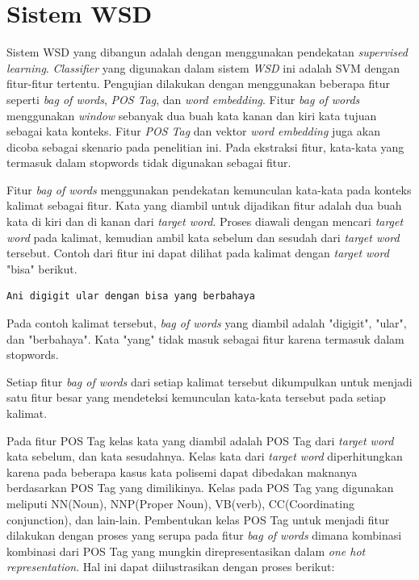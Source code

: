 \section{Sistem WSD} \label{sec:Sistem WSD}
Sistem WSD yang dibangun adalah dengan menggunakan pendekatan \textit{supervised learning}. \textit{Classifier} yang digunakan dalam sistem \textit{WSD} ini adalah SVM dengan fitur-fitur tertentu. Pengujian dilakukan dengan menggunakan beberapa fitur seperti \textit{bag of words}, \textit{POS Tag}, dan \textit{word embedding}. Fitur \textit{bag of words} menggunakan \textit{window} sebanyak dua buah kata kanan dan kiri kata tujuan sebagai kata konteks. Fitur \textit{POS Tag} dan vektor \textit{word embedding} juga akan dicoba sebagai skenario pada penelitian ini. Pada ekstraksi fitur, kata-kata yang termasuk dalam stopwords \citep{tala2003study} tidak digunakan sebagai fitur.

Fitur \textit{bag of words} menggunakan pendekatan kemunculan kata-kata pada konteks kalimat sebagai fitur. Kata yang diambil untuk dijadikan fitur adalah dua buah kata di kiri dan di kanan dari \textit{target word}. Proses diawali dengan mencari \textit{target word} pada kalimat, kemudian ambil kata sebelum dan sesudah dari \textit{target word} tersebut. Contoh dari fitur ini dapat dilihat pada kalimat dengan \textit{target word} "bisa" berikut.
\begin{lstlisting}[backgroundcolor = \color{white}]
Ani digigit ular dengan bisa yang berbahaya
\end{lstlisting}
Pada contoh kalimat tersebut, \textit{bag of words} yang diambil adalah "digigit", "ular", dan "berbahaya". Kata "yang" tidak masuk sebagai fitur karena termasuk dalam stopwords. 

Setiap fitur \textit{bag of words} dari setiap kalimat tersebut dikumpulkan untuk menjadi satu fitur besar yang mendeteksi kemunculan kata-kata tersebut pada setiap kalimat.

Pada fitur POS Tag kelas kata yang diambil adalah POS Tag dari \textit{target word} kata sebelum, dan kata sesudahnya. Kelas kata dari \textit{target word} diperhitungkan karena pada beberapa kasus kata polisemi dapat dibedakan maknanya berdasarkan POS Tag yang dimilikinya. Kelas pada POS Tag yang digunakan meliputi NN(Noun), NNP(Proper Noun), VB(verb), CC(Coordinating conjunction), dan lain-lain. Pembentukan kelas POS Tag untuk menjadi fitur dilakukan dengan proses yang serupa pada fitur \textit{bag of words} dimana kombinasi kombinasi dari POS Tag yang mungkin direpresentasikan dalam \textit{one hot representation}. Hal ini dapat diilustrasikan dengan proses berikut:

